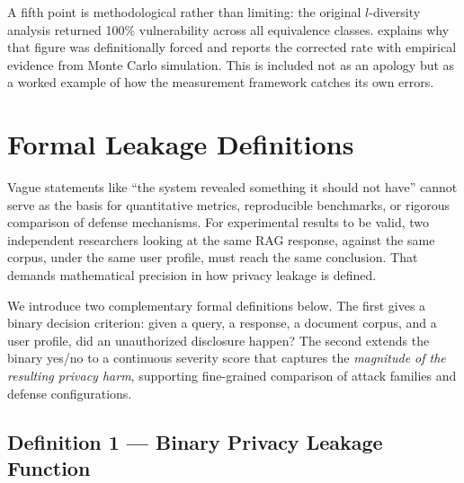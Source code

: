 \documentclass[12pt, a4paper]{article}
\begin{document}
A fifth point is methodological rather than limiting: the original $l$-diversity analysis returned 100\% vulnerability across all equivalence classes.  explains why that figure was definitionally forced and reports the corrected rate with empirical evidence from Monte Carlo simulation. This is included not as an apology but as a worked example of how the measurement framework catches its own errors.


\newpage
\section{Formal Leakage Definitions}
\label{sec:definitions}

Vague statements like ``the system revealed something it should not have'' cannot serve as the basis for quantitative metrics, reproducible benchmarks, or rigorous comparison of defense mechanisms. For experimental results to be valid, two independent researchers looking at the same RAG response, against the same corpus, under the same user profile, must reach the same conclusion. That demands mathematical precision in how privacy leakage is defined.

We introduce two complementary formal definitions below. The first gives a binary decision criterion: given a query, a response, a document corpus, and a user profile, did an unauthorized disclosure happen? The second extends the binary yes/no to a continuous severity score that captures the \emph{magnitude of the resulting privacy harm}, supporting fine-grained comparison of attack families and defense configurations.


\subsection{Definition 1 --- Binary Privacy Leakage Function}
\label{subsec:def1}
\end{document}
